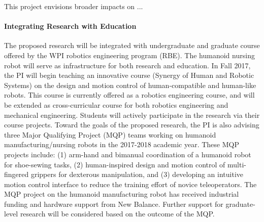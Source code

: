 \documentclass[letterpaper, 11 pt, onecolumn]{article}
\begin{document}
This project envisions broader impacts on  ... 


\paragraph*{Integrating Research with Education} 

The proposed research will be integrated with undergraduate and graduate course offered by the WPI robotics engineering program (RBE). The humanoid nursing robot will serve as infrastructure for both research and education. In Fall 2017, the PI will begin teaching an innovative course (Synergy of Human and Robotic Systems) on the design and motion control of human-compatible and human-like robots. This course is currently offered as a robotics engineering course, and will be extended as cross-curricular course for both robotics engineering and mechanical engineering. Students will actively participate in the research via their course projects. Toward the goals of the proposed research, the PI is also advising three Major Qualifying Project (MQP) teams working on humanoid manufacturing/nursing robots in the 2017-2018 academic year. These MQP projects include: (1) arm-hand and bimanual coordination of a humanoid robot for shoe-sewing tasks, (2) human-inspired design and motion control of multi-fingered grippers for dexterous manipulation, and (3) developing an intuitive motion control interface to reduce the training effort of novice teleoperators. The MQP project on the humanoid manufacturing robot has received industrial funding and hardware support from New Balance. Further support for graduate-level research will be considered based on the outcome of the MQP.
\end{document}
